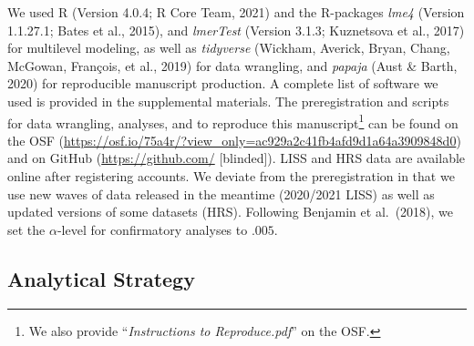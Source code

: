 \documentclass[
  english,
  man,floatsintext]{apa7}
\begin{document}
We used R (Version 4.0.4; R Core Team, 2021) and the R-packages \emph{lme4} (Version 1.1.27.1; Bates et al., 2015), and \emph{lmerTest} (Version 3.1.3; Kuznetsova et al., 2017) for multilevel modeling, as well as \emph{tidyverse} (Wickham, Averick, Bryan, Chang, McGowan, François, et al., 2019) for data wrangling, and \emph{papaja} (Aust \& Barth, 2020) for reproducible manuscript production. A complete list of software we used is provided in the supplemental materials. The preregistration and scripts for data wrangling, analyses, and to reproduce this manuscript\footnote{We also provide \enquote{\emph{Instructions to Reproduce.pdf}} on the OSF.} can be found on the OSF (\url{https://osf.io/75a4r/?view_only=ac929a2c41fb4afd9d1a64a3909848d0}) and on GitHub (\url{https://github.com/} {[}blinded{]}). LISS and HRS data are available online after registering accounts. We deviate from the preregistration in that we use new waves of data released in the meantime (2020/2021 LISS) as well as updated versions of some datasets (HRS). Following Benjamin et al.~(2018), we set the \(\alpha\)-level for confirmatory analyses to \(.005\).

\hypertarget{analytical-strategy}{%
\subsection{Analytical Strategy}\label{analytical-strategy}}
\end{document}
